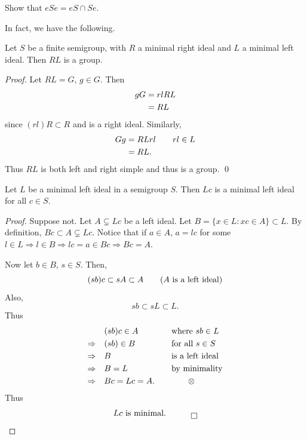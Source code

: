  Show that $eSe = eS \cap Se$.

\medskip
     In fact, we have the following.

\begin{theorem}  	\label{thm:2.1}
Let $S$ be a finite semigroup, with $R$ a minimal right ideal and $L$ a minimal left ideal.  
Then $RL$ is a group.
\end{theorem}

\begin{proof}  
Let $RL = G$, $g \in G$.  
Then
\[
     \aligned
     gG &= rlRL                                         \\
     &= RL
     \endaligned
\]
since $(rl)R \subset R$ and is a right ideal.  Similarly,
\[
     \aligned
     Gg &= RLrl \qquad rl \in L                         \\
     &= RL.
     \endaligned
\]
Thus $RL$ is both left and right simple and thus is a group.
\qed
\end{proof}

\begin{lemma}    	\label{lem:2.2}
Let $L$ be a minimal left ideal in a semigroup $S$.  
Then $Lc$ is a minimal left ideal for all $c \in S$.
\end{lemma}

\begin{proof}  
Suppose not.  
Let $A \subsetneq Lc$ be a left ideal.  
Let $B = \{ x \in L : xc \in A\} \subset L$.  
By definition, $Bc \subset A \subsetneq Lc$.  
Notice that if $a \in A$, $a = lc$ for some $l \in L \Rightarrow l \in B \Rightarrow lc = a \in Bc \Rightarrow Bc = A$.

Now let $b \in B$, $s \in S$.  
Then,
\[
     (sb)c \subset sA \subset A
               \qquad (A \hbox{ is a left ideal)}
\]
Also,
\[
     sb \subset sL \subset L.
\]
Thus
\[
     \alignedat{2}
     &(sb)c \in A &\qquad &\hbox{where } sb \in L     \\
     \Rightarrow \quad
          &(sb) \in B &\qquad &\hbox{for all } s \in S     \\
     \Rightarrow \quad
          &B &\qquad &\hbox{is a left ideal}              \\
     \Rightarrow \quad
          &B = L &\qquad &\hbox{by minimality}            \\
     \Rightarrow \quad
          &Bc = Lc = A. &\quad & \qquad\otimes
     \endalignedat
\]
Thus
\[
     Lc \hbox{ is minimal}. \quad \qed
\]
\end{proof}

